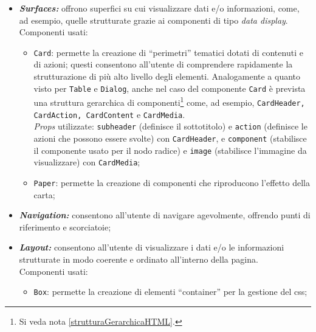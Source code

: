 \begin{itemize}
  \item \textbf{\textit{Surfaces:}} offrono superfici su cui visualizzare dati e/o informazioni, come, ad esempio, quelle strutturate grazie ai componenti di tipo \textit{data display}.\\
  Componenti usati:
    \begin{itemize}
      \item \texttt{Card}: permette la creazione di “perimetri” tematici dotati di contenuti e di azioni; questi consentono all'utente di comprendere rapidamente la strutturazione di più alto livello degli elementi. Analogamente a quanto visto per \texttt{Table} e \texttt{Dialog}, anche nel caso del componente \texttt{Card} è prevista una struttura gerarchica di componenti\footnote{Si veda nota \ref{strutturaGerarchicaHTML}.} come, ad esempio, \texttt{CardHeader, CardAction, CardContent} e \texttt{CardMedia}.\\
      \textit{Props} utilizzate: \texttt{subheader} (definisce il sottotitolo) e \texttt{action} (definisce le azioni che possono essere svolte) con \texttt{CardHeader}, e \texttt{component} (stabilisce il componente usato per il nodo radice) e \texttt{image} (stabilisce l'immagine da visualizzare) con \texttt{CardMedia};
      
      \item \texttt{Paper}: permette la creazione di componenti che riproducono l'effetto della carta;
    \end{itemize}

  \item \textbf{\textit{Navigation:}} consentono all'utente di navigare agevolmente, offrendo punti di riferimento e scorciatoie;

  \item \textbf{\textit{Layout:}} consentono all'utente di visualizzare i dati e/o le informazioni strutturate in modo coerente e ordinato all'interno della pagina.\\
  Componenti usati:
    \begin{itemize}
      \item \texttt{Box}: permette la creazione di elementi “container” per la gestione del \gls{css};


\end{itemize}
\end{itemize}
